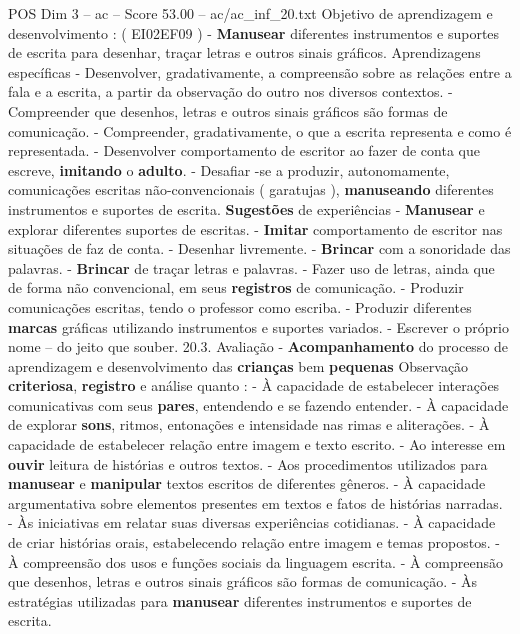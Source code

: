 \begin{textsample}{POS Dim 3 – ac – Score 53.00 – ac/ac\_inf\_20.txt}
Objetivo de aprendizagem e desenvolvimento : ( EI02EF09 ) - \textbf{Manusear} diferentes instrumentos e suportes de escrita para desenhar, traçar letras e outros sinais gráficos.
Aprendizagens específicas - Desenvolver, gradativamente, a compreensão sobre as relações entre a fala e a escrita, a partir da observação do outro nos diversos contextos. - Compreender que desenhos, letras e outros sinais gráficos são formas de comunicação. - Compreender, gradativamente, o que a escrita representa e como é representada. - Desenvolver comportamento de escritor ao fazer de conta que escreve, \textbf{imitando} o \textbf{adulto}. - Desafiar -se a produzir, autonomamente, comunicações escritas não-convencionais ( garatujas ), \textbf{manuseando} diferentes instrumentos e suportes de escrita. \textbf{Sugestões} de experiências - \textbf{Manusear} e explorar diferentes suportes de escritas. - \textbf{Imitar} comportamento de escritor nas situações de faz de conta. - Desenhar livremente. - \textbf{Brincar} com a sonoridade das palavras. - \textbf{Brincar} de traçar letras e palavras. - Fazer uso de letras, ainda que de forma não convencional, em seus \textbf{registros} de comunicação. - Produzir comunicações escritas, tendo o professor como escriba. - Produzir diferentes \textbf{marcas} gráficas utilizando instrumentos e suportes variados. - Escrever o próprio nome – do jeito que souber. 20.3.
Avaliação - \textbf{Acompanhamento} do processo de aprendizagem e desenvolvimento das \textbf{crianças} bem \textbf{pequenas} Observação \textbf{criteriosa}, \textbf{registro} e análise quanto : - À capacidade de estabelecer interações comunicativas com seus \textbf{pares}, entendendo e se fazendo entender. - À capacidade de explorar \textbf{sons}, ritmos, entonações e intensidade nas rimas e aliterações. - À capacidade de estabelecer relação entre imagem e texto escrito. - Ao interesse em \textbf{ouvir} leitura de histórias e outros textos. - Aos procedimentos utilizados para \textbf{manusear} e \textbf{manipular} textos escritos de diferentes gêneros. - À capacidade argumentativa sobre elementos presentes em textos e fatos de histórias narradas. - Às iniciativas em relatar suas diversas experiências cotidianas. - À capacidade de criar histórias orais, estabelecendo relação entre imagem e temas propostos. - À compreensão dos usos e funções sociais da linguagem escrita. - À compreensão que desenhos, letras e outros sinais gráficos são formas de comunicação. - Às estratégias utilizadas para \textbf{manusear} diferentes instrumentos e suportes de escrita.

\end{textsample}
